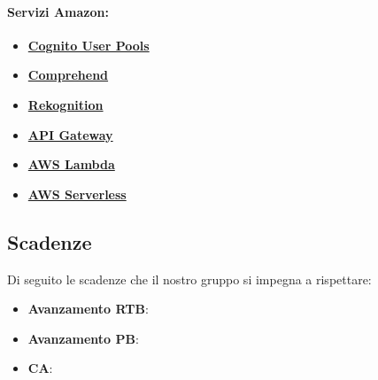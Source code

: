 	\paragraph{\textbf{Servizi Amazon:}} 
\begin{itemize}
	\item
	\href {https://docs.aws.amazon.com/cognito/latest/developerguide/cognito-user-identity-pools.html}{\textbf{Cognito User Pools}}
	\item
	\href{https://docs.aws.amazon.com/comprehend/latest/dg/what-is.html}{\textbf{Comprehend}}
	\item 
	\href{https://docs.aws.amazon.com/rekognition/latest/dg/what-is.html}{\textbf{Rekognition}}
	\item 
	\href{https://docs.aws.amazon.com/apigateway/latest/developerguide/welcome.html}{\textbf{API Gateway}}
	\item
	\href{https://docs.aws.amazon.com/lambda/latest/dg/welcome.html}{\textbf{AWS Lambda}}
	\item 
	\href{https://docs.aws.amazon.com/serverless-application-model/latest/developerguide/what-is-sam.html}{\textbf{AWS Serverless}}
\end{itemize}

\subsection{Scadenze}
Di seguito le scadenze che il nostro gruppo si impegna a rispettare:
\begin{itemize}
	\item \textbf{Avanzamento RTB}:
	\item \textbf{Avanzamento PB}:
	\item \textbf{CA}:
\end{itemize}
